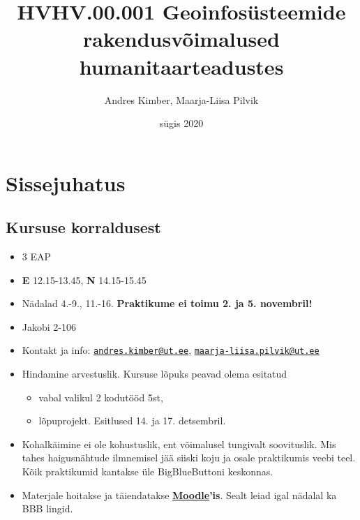 \documentclass[
]{book}
\title{HVHV.00.001 Geoinfosüsteemide rakendusvõimalused humanitaarteadustes}
\author{Andres Kimber, Maarja-Liisa Pilvik}
\date{sügis 2020}
\providecommand{\tightlist}{%
  \setlength{\itemsep}{0pt}\setlength{\parskip}{0pt}}
\begin{document}
\maketitle

{
\setcounter{tocdepth}{1}
\tableofcontents
}
\hypertarget{sissejuhatus}{%
\chapter{Sissejuhatus}\label{sissejuhatus}}

\hypertarget{kursuse-korraldusest}{%
\section{Kursuse korraldusest}\label{kursuse-korraldusest}}

\begin{itemize}
\tightlist
\item
  3 EAP\\
\item
  \textbf{E} 12.15-13.45, \textbf{N} 14.15-15.45\\
\item
  Nädalad 4.-9., 11.-16. \textbf{Praktikume ei toimu 2. ja 5. novembril!}\\
\item
  Jakobi 2-106
\item
  Kontakt ja info: \href{mailto:andres.kimber@ut.ee}{\nolinkurl{andres.kimber@ut.ee}}, \href{mailto:maarja-liisa.pilvik@ut.ee}{\nolinkurl{maarja-liisa.pilvik@ut.ee}}\\
\item
  Hindamine arvestuslik. Kursuse lõpuks peavad olema esitatud

  \begin{itemize}
  \tightlist
  \item
    vabal valikul 2 kodutööd 5st,\\
  \item
    lõpuprojekt. Esitlused 14. ja 17. detsembril.
  \end{itemize}
\item
  Kohalkäimine ei ole kohustuslik, ent võimalusel tungivalt soovituslik. Mis tahes haigusnähtude ilmnemisel jää siiski koju ja osale praktikumis veebi teel. Kõik praktikumid kantakse üle BigBlueButtoni keskonnas.\\
\item
  Materjale hoitakse ja täiendatakse \textbf{\href{https://moodle.ut.ee/course/view.php?id=10284}{Moodle}'is}. Sealt leiad igal nädalal ka BBB lingid.
\end{itemize}
\end{document}
